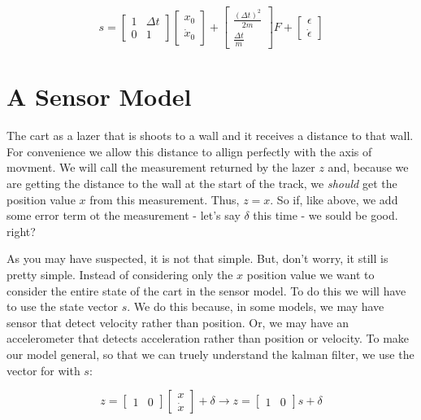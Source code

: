 \documentclass[11pt]{article}
\begin{document}
\[
s
=
\begin{bmatrix}
1 & \Delta t\\
0 & 1
\end{bmatrix}
\begin{bmatrix}
x_0\\
\dot{x}_0
\end{bmatrix}
+
\begin{bmatrix}
\frac{(\Delta t)^2}{2m}\\
\frac{\Delta t}{m}
\end{bmatrix}
F
+
\begin{bmatrix}
\epsilon\\
\dot{\epsilon}
\end{bmatrix}
\]

\section{A Sensor Model}

The cart as a lazer that is shoots to a wall and it receives a distance to that wall.
For convenience we allow this distance to allign perfectly with the axis of movment.
We will call the measurement returned by the lazer $z$ and, because we are getting the
distance to the wall at the start of the track, we \textit{should} get the position
value $x$ from this measurement. Thus, $z = x$. So if, like above, we add some error
term ot the measurement - let's say $\delta$ this time - we sould be good. right?

As you may have suspected, it is not that simple. But, don't worry, it still is
pretty simple. Instead of considering only the $x$ position value we want to consider
the entire state of the cart in the sensor model. To do this we will have to use
the state vector $s$. We do this because, in some models, we may have sensor that
detect velocity rather than position. Or, we may have an accelerometer that detects
acceleration rather than position or velocity. To make our model general, so that
we can truely understand the kalman filter, we use the vector for with $s$:

\[
z =
\begin{bmatrix}
1 & 0
\end{bmatrix}
\begin{bmatrix}
x\\
\dot{x}
\end{bmatrix}
+
\delta
\rightarrow
z =
\begin{bmatrix}
1 & 0
\end{bmatrix}
s
+
\delta
\]
\end{document}
